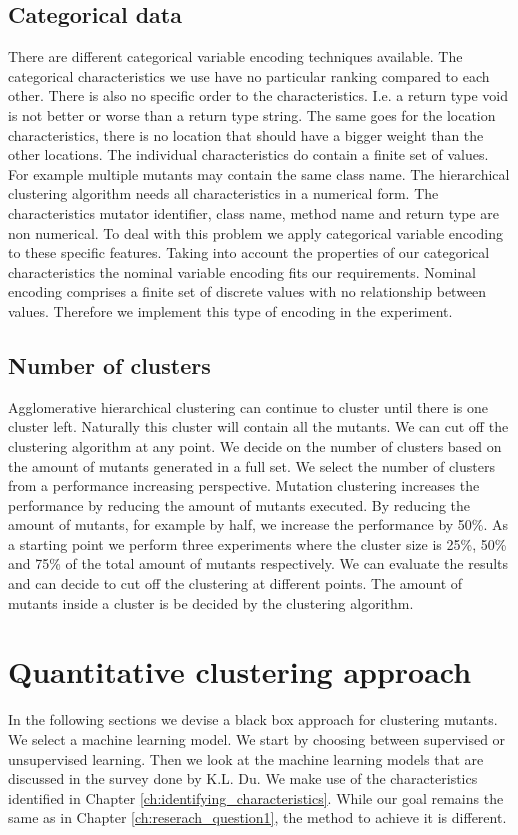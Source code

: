 \documentclass[conference,draftclsnofoot,onecolumn]{IEEEtran}
\begin{document}
\subsection{Categorical data}
There are different categorical variable encoding techniques available\cite{Potdar2017AClassifiers}.
The categorical characteristics we use have no particular ranking compared to each other.
There is also no specific order to the characteristics.
I.e. a return type void is not better or worse than a return type string.
The same goes for the location characteristics, there is no location that should have a bigger weight than the other locations.
The individual characteristics do contain a finite set of values.
For example multiple mutants may contain the same class name.
The hierarchical clustering algorithm needs all characteristics in a numerical form\cite{Vijaya2019ComparativeClustering}.
The characteristics mutator identifier, class name, method name and return type are non numerical.
To deal with this problem we apply categorical variable encoding to these specific features.
Taking into account the properties of our categorical characteristics the nominal variable encoding fits our requirements.
Nominal encoding comprises a finite set of discrete values with no relationship between values\cite{Potdar2017AClassifiers}.
Therefore we implement this type of encoding in the experiment.

\subsection{Number of clusters}
Agglomerative hierarchical clustering can continue to cluster until there is one cluster left. 
Naturally this cluster will contain all the mutants.
We can cut off the clustering algorithm at any point.
We decide on the number of clusters based on the amount of mutants generated in a full set.
We select the number of clusters from a performance increasing perspective.
Mutation clustering increases the performance by reducing the amount of mutants executed\cite{Pizzoleto2019}.
By reducing the amount of mutants, for example by half, we increase the performance by 50\%\cite{Just2014AreTesting}.
As a starting point we perform three experiments where the cluster size is 25\%, 50\% and 75\% of the total amount of mutants respectively.
We can evaluate the results and can decide to cut off the clustering at different points.
The amount of mutants inside a cluster is be decided by the clustering algorithm.

\section{Quantitative clustering approach}
\label{ch:reserach_question2}
In the following sections we devise a black box approach for clustering mutants.
We select a machine learning model.
We start by choosing between supervised or unsupervised learning.
Then we look at the machine learning models that are discussed in the survey done by K.L. Du\cite{Du2010Clustering:Approach}.
We make use of the characteristics identified in Chapter \ref{ch:identifying_characteristics}.
While our goal remains the same as in Chapter \ref{ch:reserach_question1}, the method to achieve it is different.
\end{document}
